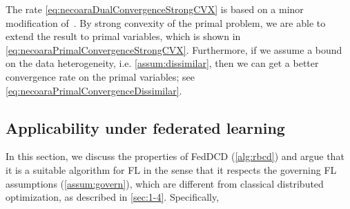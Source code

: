 The rate \eqref{eq:necoaraDualConvergenceStrongCVX} is based on a minor modification of~\citet[Theorem~3.1]{necoara2017random}. By strong convexity of the primal problem, we are able to extend the result to primal variables, which is shown in \autoref{eq:necoaraPrimalConvergenceStrongCVX}. Furthermore, if we assume a bound on the data heterogeneity, i.e. \autoref{assum:dissimilar}, then we can get a better convergence rate on the primal variables; see \autoref{eq:necoaraPrimalConvergenceDissimilar}.

\subsection{Applicability under federated learning}
In this section, we discuss the properties of FedDCD (\autoref{alg:rbcd}) and argue that it is a suitable algorithm for FL in the sense that it respects the governing FL assumptions (\autoref{assum:govern}), which are different from classical distributed optimization, as described in \autoref{sec:1-4}. Specifically, 
